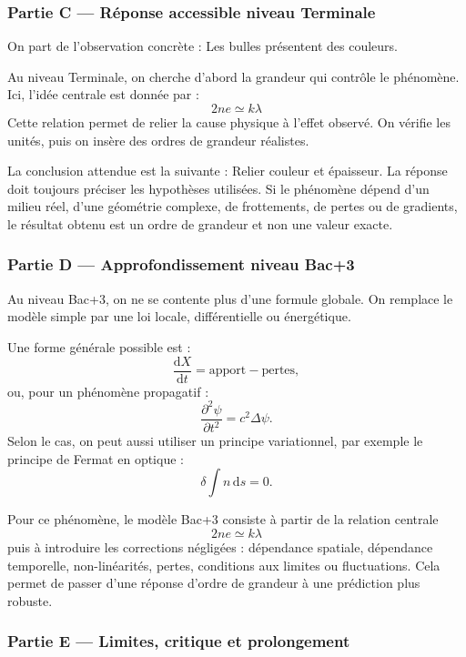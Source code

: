 \documentclass[11pt,a4paper]{article}
\begin{document}
\subsubsection*{Partie C — Réponse accessible niveau Terminale}

\begin{corrigebox}
On part de l'observation concrète : Les bulles présentent des couleurs.

Au niveau Terminale, on cherche d'abord la grandeur qui contrôle le phénomène. Ici, l'idée centrale est donnée par :
\[
2ne\simeq k\lambda
\]
Cette relation permet de relier la cause physique à l'effet observé. On vérifie les unités, puis on insère des ordres de grandeur réalistes.

La conclusion attendue est la suivante : Relier couleur et épaisseur. La réponse doit toujours préciser les hypothèses utilisées. Si le phénomène dépend d'un milieu réel, d'une géométrie complexe, de frottements, de pertes ou de gradients, le résultat obtenu est un ordre de grandeur et non une valeur exacte.
\end{corrigebox}

\subsubsection*{Partie D — Approfondissement niveau Bac+3}

\begin{approfondissementbox}
Au niveau Bac+3, on ne se contente plus d'une formule globale. On remplace le modèle simple par une loi locale, différentielle ou énergétique.

Une forme générale possible est :
\[
\frac{\mathrm d X}{\mathrm dt}=\text{apport}-\text{pertes},
\]
ou, pour un phénomène propagatif :
\[
\frac{\partial^2 \psi}{\partial t^2}=c^2\Delta\psi.
\]
Selon le cas, on peut aussi utiliser un principe variationnel, par exemple le principe de Fermat en optique :
\[
\delta \int n\,\mathrm ds=0.
\]

Pour ce phénomène, le modèle Bac+3 consiste à partir de la relation centrale
\[
2ne\simeq k\lambda
\]
puis à introduire les corrections négligées : dépendance spatiale, dépendance temporelle, non-linéarités, pertes, conditions aux limites ou fluctuations. Cela permet de passer d'une réponse d'ordre de grandeur à une prédiction plus robuste.
\end{approfondissementbox}

\subsubsection*{Partie E — Limites, critique et prolongement}
\end{document}
